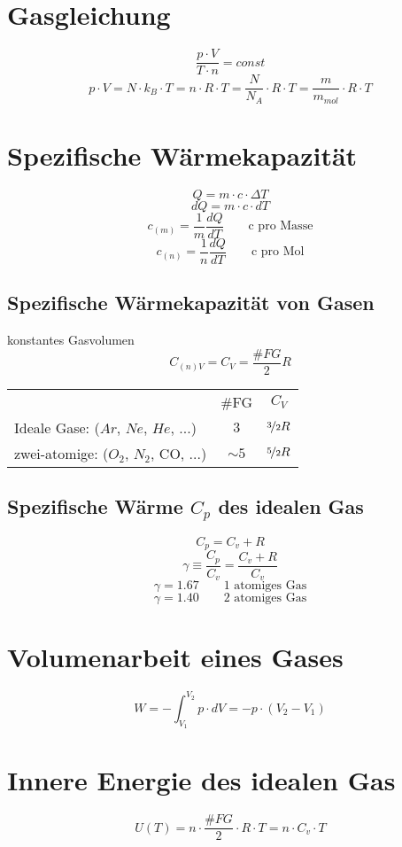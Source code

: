 \section{Gasgleichung}
\[ \boxed{\frac{p \cdot V}{T \cdot n} = const} \]
\[ \boxed{p \cdot V = N \cdot k_B \cdot T 
= n \cdot R \cdot T 
= \frac{N}{N_A} \cdot R \cdot T 
= \frac{m}{m_{mol}} \cdot R \cdot T } \]

\section{Spezifische Wärmekapazität}
\[ \boxed{Q = m \cdot c \cdot \Delta T} \]
\[ \boxed{dQ = m \cdot c \cdot d T} \]
\[ \boxed{c_{(m)} = \frac{1}{m} \frac{dQ}{d T} \qquad \text{c pro Masse}} \]
\[ \boxed{c_{(n)} = \frac{1}{n} \frac{dQ}{d T} \qquad \text{c pro Mol}} \]

\subsection{Spezifische Wärmekapazität von Gasen}
konstantes Gasvolumen
\[ \boxed{C_{(n)V} = C_{V} = \frac{\#FG}{2}R} \]
\begin{tabular}{lcc}
                                      & \#FG     & $C_V$ \\
Ideale Gase: ($Ar$, $Ne$, $He$, ...)  & $3$      & $\nicefrac{3}{2} R$ \\
zwei-atomige: ($O_2$, $N_2$, CO, ...) & $\sim 5$ & $\nicefrac{5}{2} R$ 
\end{tabular}

\subsection{Spezifische Wärme $C_p$ des idealen Gas}
\[ \boxed{C_p = C_v + R} \]
\[ \boxed{\gamma \equiv \frac{C_p}{C_v} = \frac{C_v + R}{C_v}} \]
\[ \gamma = 1.67 \qquad \text{1 atomiges Gas} \]
\[ \gamma = 1.40 \qquad \text{2 atomiges Gas} \]

\section{Volumenarbeit eines Gases}
\[ \boxed{W = -\int_{V_1}^{V_2} p \cdot dV = - p \cdot (V_2 - V_1)} \]

\section{Innere Energie des idealen Gas}
\[ \boxed{U(T) = n \cdot \frac{\#FG}{2} \cdot R \cdot T = n \cdot C_v \cdot T} \]

